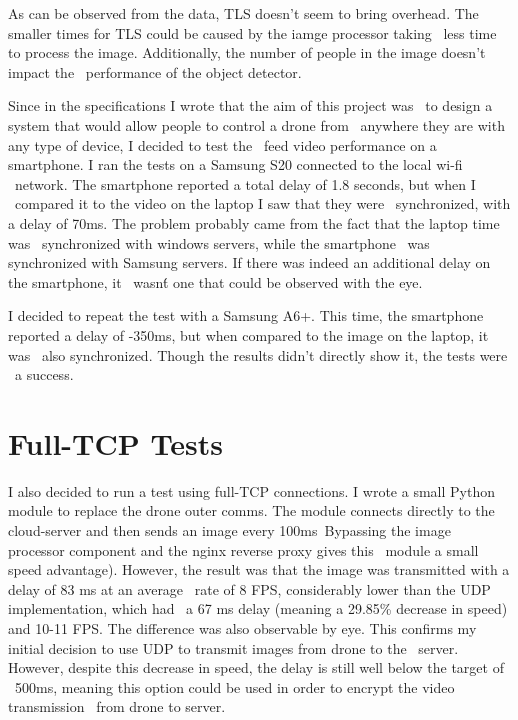 As can be observed from the data, TLS doesn't seem to bring overhead.
The smaller times for TLS could be caused by the iamge processor taking \
less time to process the image.
Additionally, the number of people in the image doesn't impact the \
performance of the object detector.

Since in the specifications I wrote that the aim of this project was \
to design a system that would allow people to control a drone from \
anywhere they are with any type of device, I decided to test the \
feed video performance on a smartphone.
I ran the tests on a Samsung S20 connected to the local wi-fi \
network.
The smartphone reported a total delay of 1.8 seconds, but when I \
compared it to the video on the laptop I saw that they were \
synchronized, with a delay of 70ms.
The problem probably came from the fact that the laptop time was \
synchronized with windows servers, while the smartphone \
was synchronized with Samsung servers.
If there was indeed an additional delay on the smartphone, it \
wasn\'t one that could be observed with the eye.

I decided to repeat the test with a Samsung A6+.
This time, the smartphone reported a delay of -350ms,
but when compared to the image on the laptop, it was \
also synchronized.
Though the results didn't directly show it, the tests were \
a success.

\section{Full-TCP Tests}
\label{sec:tcp-tests}
I also decided to run a test using full-TCP connections.
I wrote a small Python module to replace the drone outer comms.
The module connects directly to the cloud-server and then sends an image every 100ms\
Bypassing the image processor component and the nginx reverse proxy gives this \
module a small speed advantage).
However, the result was that the image was transmitted with a delay of 83 ms at an average \
rate of 8 FPS, considerably lower than the UDP implementation, which had \
a 67 ms delay (meaning a 29.85\% decrease in speed) and 10-11 FPS.
The difference was also observable by eye.
This confirms my initial decision to use UDP to transmit images from drone to the \
server.
However, despite this decrease in speed, the delay is still well below the target of \
500ms, meaning this option could be used in order to encrypt the video transmission \
from drone to server.